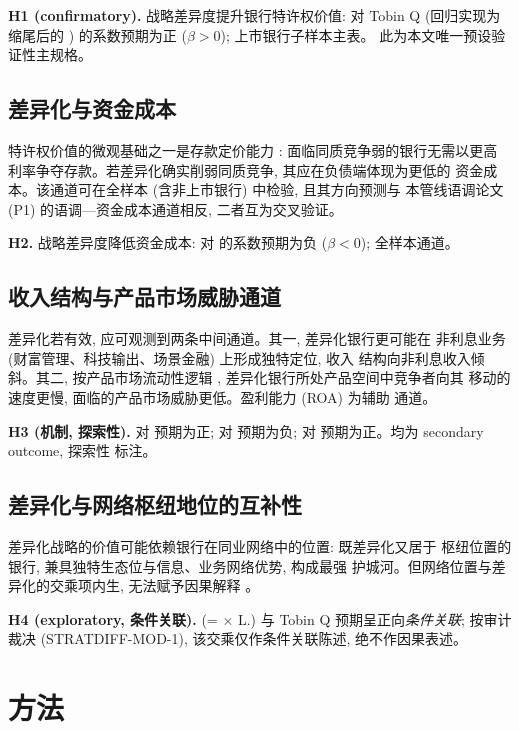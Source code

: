 \textbf{H1 (confirmatory).} 战略差异度提升银行特许权价值:
 对 Tobin Q (回归实现为缩尾后的
) 的系数预期为正 ($\beta>0$); 上市银行子样本主表。
此为本文唯一预设验证性主规格。

\subsection{差异化与资金成本}
特许权价值的微观基础之一是存款定价能力
\parencite{drechsler2026franchise}: 面临同质竞争弱的银行无需以更高
利率争夺存款。若差异化确实削弱同质竞争, 其应在负债端体现为更低的
资金成本。该通道可在全样本 (含非上市银行) 中检验, 且其方向预测与
本管线语调论文 (P1) 的语调—资金成本通道相反, 二者互为交叉验证。

\textbf{H2.} 战略差异度降低资金成本:  对
 的系数预期为负 ($\beta<0$); 全样本通道。

\subsection{收入结构与产品市场威胁通道}
差异化若有效, 应可观测到两条中间通道。其一, 差异化银行更可能在
非利息业务 (财富管理、科技输出、场景金融) 上形成独特定位, 收入
结构向非利息收入倾斜。其二, 按产品市场流动性逻辑
\parencite{hoberg2014fluidity}, 差异化银行所处产品空间中竞争者向其
移动的速度更慢, 面临的产品市场威胁更低。盈利能力 (ROA) 为辅助
通道。

\textbf{H3 (机制, 探索性).}  对
 预期为正; 对 
预期为负; 对  预期为正。均为 secondary outcome, 探索性
标注。

\subsection{差异化与网络枢纽地位的互补性}
差异化战略的价值可能依赖银行在同业网络中的位置: 既差异化又居于
枢纽位置的银行, 兼具独特生态位与信息、业务网络优势, 构成最强
护城河。但网络位置与差异化的交乘项内生, 无法赋予因果解释
\parencite{brambor2006understanding}。

\textbf{H4 (exploratory, 条件关联).} 
(=  $\times$ L.) 与
Tobin Q 预期呈正向\emph{条件关联}; 按审计裁决
(STRATDIFF-MOD-1), 该交乘仅作条件关联陈述, 绝不作因果表述。

\section{方法}\label{sec:method}
